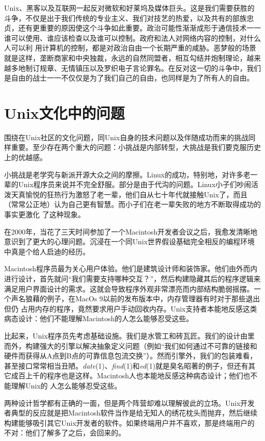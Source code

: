 \documentclass[12pt,oneside]{ctexbook}
\begin{document}
\begin{common-format}
Unix、黑客以及互联网一起反对微软和好莱坞及媒体巨头。这是我们需要获胜的斗争，不仅是出于我们传统的专业主义、我们对技艺的热爱，以及共有的部族忠贞，还有更重要的原因使这个斗争如此重要。政治可能性渐渐成形于通信技术一一谁可以使用、谁应该检查以及谁可以控制。政府和法人对网络内容的控制，对什么人可以利
用计算机的控制，都是对政治自由一个长期严重的咸胁。恶梦般的场景就是这样，垄断商家和中央独裁，永远的自然同盟者，相互勾结并炮制理论，越来越多地制订规章、无情镇压以及罗织电子言论罪名。在反对这一切的斗争中，我们是自由的战士一一不仅仅是为了我们自己的自由，也同样是为了所有人的自由。

\section{Unix文化中的问题}
围绕在Unix社区的文化问题，同Unix自身的技术问题以及伴随成功而来的挑战同样重要。至少存在两个重大的问题：小挑战是内部转型，大挑战是我们要克服历史上的优越感。

小挑战是老学究与新派开源大众之间的摩擦。Linux的成功，特别地，对许多老一辈的Unix程序员来说并不完全舒服。部分是由于代沟的问题。Linux小子们吵闹活泼天真愉悦的狂热行为激怒了老一辈，他们自从七十年代就接触Unix了，而且（常常公正地）认为自己更有智慧。而小子们在老一辈失败的地方不断取得成功的事实更激化
了这种现象。

在2000年，当花了三天时间参加了一个Macintosh开发者会议之后，我愈发清晰地意识到了更大的心理问题。沉浸在一个同Unix世界假设基础完全相反的编程环境中真是个给人启迪的经历。

Macintosh程序员最为关心用户体验。他们是建筑设计师和装饰家。他们由外而内进行设计，首先就问“我们需要支持哪种交互？”，然后构建隐藏其后的程序逻辑来满足用户界面设计的需求。这就会导致程序外观非常漂亮而内部结构脆弱摇摆。一个声名狼藉的例子，在MacOs 9以前的发布版本中，内存管理器有时对于那些退出但仍
占用内存的程序，竟然要求用户手动回收内存。Unix支持者本能地反感这类病态设计：他们不能理解Macintosh的人怎么能够忍受这些。

比起来，Unix程序员先考虑基础设施。我们是水管工和砖瓦匠。我们的设计由里而外，构建强大的引擎以解决抽象定义问题（例如“我们如何通过不可靠的链接和硬件而获得从A点到B点的可靠信息包流交换”）。然而引擎外，我们的包装难看，甚至接口常常相当丑陋。\textit{date}(1)、\textit{find}(1)和\textit{ed}(1)就是臭名昭著的例子，但还有其它成百上千的程序也是这样。Macintosh人也本能地反感这种病态设计；他们也不能理解Unix的
人怎么能够忍受这些。

两种设计哲学都有正确的一面，但是两个阵营却难以理解彼此的立场。Unix开发者典型的反应就是把Macintosh软件当作是给无知人的绣花枕头而抛弃，然后继续构建能够吸引其它Unix开发者的软件。如果终端用户并不喜欢，那是终端用户的不对：他们了解多了之后，会回来的。


\end{common-format}
\end{document}

